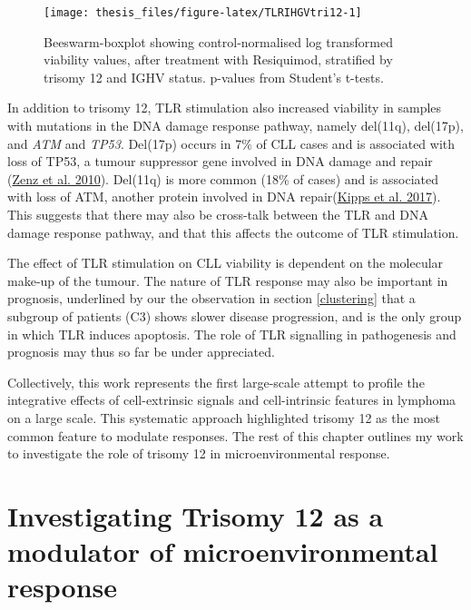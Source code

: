 \documentclass[11pt, a4paper, twosided]{book}
\begin{document}
\begin{figure}

{\centering \texttt{[image: thesis\_files/figure-latex/TLRIHGVtri12-1]} 

}

\caption{Beeswarm-boxplot showing control-normalised log transformed viability values, after treatment with Resiquimod, stratified by trisomy 12 and IGHV status. p-values from Student's t-tests.}\label{fig:TLRIHGVtri12}
\end{figure}
In addition to trisomy 12, TLR stimulation also increased viability in samples with mutations in the DNA damage response pathway, namely del(11q), del(17p), and \emph{ATM} and \emph{TP53}. Del(17p) occurs in 7\% of CLL cases and is associated with loss of TP53, a tumour suppressor gene involved in DNA damage and repair (\protect\hyperlink{ref-Zenz2010}{Zenz et al. 2010}). Del(11q) is more common (18\% of cases) and is associated with loss of ATM, another protein involved in DNA repair(\protect\hyperlink{ref-Kipps2017}{Kipps et al. 2017}). This suggests that there may also be cross-talk between the TLR and DNA damage response pathway, and that this affects the outcome of TLR stimulation.

The effect of TLR stimulation on CLL viability is dependent on the molecular make-up of the tumour. The nature of TLR response may also be important in prognosis, underlined by our the observation in section \ref{clustering} that a subgroup of patients (C3) shows slower disease progression, and is the only group in which TLR induces apoptosis. The role of TLR signalling in pathogenesis and prognosis may thus so far be under appreciated.

Collectively, this work represents the first large-scale attempt to profile the integrative effects of cell-extrinsic signals and cell-intrinsic features in lymphoma on a large scale. This systematic approach highlighted trisomy 12 as the most common feature to modulate responses. The rest of this chapter outlines my work to investigate the role of trisomy 12 in microenvironmental response.

\hypertarget{investigating-trisomy-12-as-a-modulator-of-microenvironmental-response}{%
\section{Investigating Trisomy 12 as a modulator of microenvironmental response}\label{investigating-trisomy-12-as-a-modulator-of-microenvironmental-response}}
\end{document}

